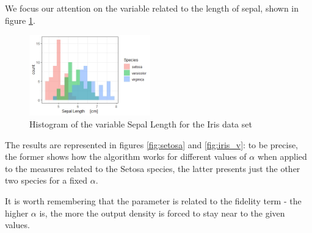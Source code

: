 We focus our attention on the variable related to the length of sepal, shown in figure \ref{fig:iris}.

\begin{figure}
	\includegraphics[height=3.5cm]{./pictures/iris/iris.jpeg}
	\centering
	\caption{Histogram of the variable Sepal Length for the Iris data set}
	\label{fig:iris}	
\end{figure}

The results are represented in figures \ref{fig:setosa} and \ref{fig:iris_v}: to be precise, the former shows how the algorithm works for different values of $\alpha$ when applied to the measures related to the Setosa species, the latter presents just the other two species for a fixed $\alpha$. 

It is worth remembering that the parameter is related to the fidelity term - the higher $\alpha$ is, the more the output density is forced to stay near to the given values.

